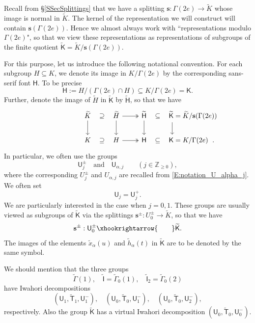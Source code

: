 \documentclass[10pt, letterpaper]{amsart}
\theoremstyle{plain}
\theoremstyle{definition}
\numberwithin{equation}{section}
\newcommand{\Z}{\mathbb{Z}}
\newcommand{\xt}{\tilde{x}}
\newcommand{\htt}{\tilde{h}}
\newcommand{\Ht}{\widetilde{H}}
\newcommand{\Kt}{\widetilde{K}}
\newcommand{\s}{\mathbf{s}}
\newcommand{\Hf}{\mathsf{H}}
\newcommand{\If}{\mathsf{I}}
\newcommand{\Kf}{\mathsf{K}}
\newcommand{\Tf}{\mathsf{T}}
\newcommand{\Uf}{\mathsf{U}}
\newcommand{\Gammaf}{\mathsf{\Gamma}}
\newcommand{\Kft}{\widetilde{\mathsf{K}}}
\newcommand{\qand}{{\quad\text{and}\quad}}
\begin{document}
Recall from \S \ref{SSecSplittings} that we have a splitting $\s:\Gamma(2e)\to\Kt$ whose image is normal in $\Kt$. The kernel of the representation we will construct will contain $\s(\Gamma(2e))$. Hence we almost always work with ``representations modulo ${\Gamma(2e)}$", so that we view these representations as representations of subgroups of the finite quotient $\widetilde{\Kf}=\Kt\slash \s(\Gamma(2e))$. 

For this purpose, let us introduce the following notational convention. For each subgroup $H\subseteq K$, we denote its image in $K\slash\Gamma(2e)$ by the corresponding sans-serif font $\Hf$. To be precise
\[
\Hf:=H\slash (\Gamma(2e)\cap H)\subseteq K\slash \Gamma(2e)=\Kf.
\]
Further, denote the image of $\Ht$ in $\Kft$ by $\widetilde{\Hf}$, so that we have
\[
\begin{tikzcd}
    \Kt\arrow[r, phantom, "\supseteq"]\ar[d]&\Ht\arrow[r, two heads]\ar[d]&\widetilde{\Hf}\arrow[r, phantom, "\subseteq"]\ar[d]&\makebox[0pt][l]{$\widetilde{\Kf}=\Kt\slash\s(\Gamma(2e))$}\ar[d, shift left=.5em]\\
    K\arrow[r, phantom, "\supseteq"]&H\arrow[r, two heads]&\Hf\arrow[r, phantom, "\subseteq"]&\makebox[0pt][l]{$\Kf=K\slash\Gamma(2e)$\rlap{\; .}}
\end{tikzcd}
\]
In particular, we often use the groups
\[
\Uf_{j}^{\pm}\qand  \Uf_{\alpha, j}\qquad (j\in\Z_{\geq 0}),
\]
where the corresponding $U_j^{\pm}$ and $U_{\alpha, j}$ are recalled from \eqref{E:notation_U_alpha_j}. We often set
\[
\Uf_j=\Uf_j^{+}.
\]
 We are particularly interested in the case when $j=0, 1$.
These groups are usually viewed as subgroups of $\widetilde{\Kf}$ via the splittings $\s^{\pm}:U_0^{\pm}\to\Kt$, so that we have
\[
\s^{\pm}:\Uf_0^{\pm}\xhookrightarrow{\qquad}\widetilde{\Kf}.
\]
The images of the elements $\xt_{\alpha}(u)$ and $\htt_{\alpha}(t)$ in $\widetilde{\Kf}$ are to be denoted by the same symbol.

We should mention that the three groups 
\[
\widetilde{\Gammaf}(1),\quad \widetilde{\If}=\widetilde{\Gammaf}_0(1),\quad \widetilde{\If}_2=\widetilde{\Gammaf}_0(2)
\]
have Iwahori decompositions
\[
(\Uf_1, \widetilde{\Tf}_1, \Uf_1^-),\quad (\Uf_0, \widetilde{\Tf}_0, \Uf_1^-),\quad (\Uf_0, \widetilde{\Tf}_0, \Uf_2^-),
\]
respectively. Also the group $\widetilde{\Kf}$ has a virtual Iwahori decomposition $(\Uf_0,\widetilde{\Tf}_0, \Uf_0^-)$.
\end{document}
